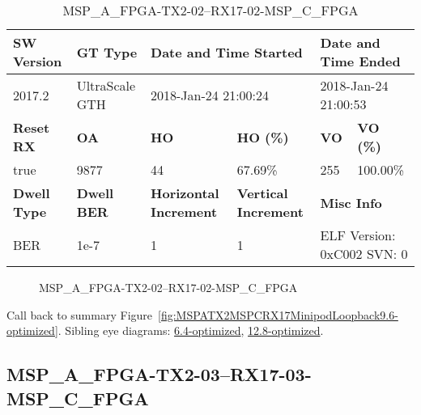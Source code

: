 \begin{table}[h]
\centering
\caption{MSP\_A\_FPGA-TX2-02--RX17-02-MSP\_C\_FPGA}
\label{tab:MSPAFPGATX202RX1702MSPCFPGA9.6-optimized}
\begin{tabular}{@{}|l|l|l|l|l|l|@{}}
\toprule
\textbf{SW Version}                & \textbf{GT Type}   & \multicolumn{2}{l|}{\textbf{Date and Time Started}}            & \multicolumn{2}{l|}{\textbf{Date and Time Ended}}        \\ \midrule
2017.2                       & UltraScale GTH          & \multicolumn{2}{l|}{2018-Jan-24 21:00:24}                   & \multicolumn{2}{l|}{2018-Jan-24 21:00:53}               \\ \midrule
\textbf{Reset RX}                  & \textbf{OA} & \textbf{HO}   & \textbf{HO (\%)} & \textbf{VO} & \textbf{VO (\%)} \\ \midrule
true & 9877        & 44          & 67.69\%        & 255        & 100.00\%       \\ \midrule
\textbf{Dwell Type}                & \textbf{Dwell BER} & \textbf{Horizontal Increment} & \textbf{Vertical Increment}    & \multicolumn{2}{l|}{\textbf{Misc Info}}                  \\ \midrule
BER                            & 1e-7        & 1        & 1           & \multicolumn{2}{l|}{ELF Version: 0xC002 SVN: 0}                         \\ \bottomrule
\end{tabular}
\end{table}

\begin{figure}[h]
\caption{MSP\_A\_FPGA-TX2-02--RX17-02-MSP\_C\_FPGA} \label{fig:MSPAFPGATX202RX1702MSPCFPGA9.6-optimized}
\end{figure}

Call back to summary Figure~\ref{fig:MSPATX2MSPCRX17MinipodLoopback9.6-optimized}.
Sibling eye diagrams: \hyperref[sec:MSPAFPGATX202RX1702MSPCFPGA6.4-optimized]{6.4-optimized}, \hyperref[sec:MSPAFPGATX202RX1702MSPCFPGA12.8-optimized]{12.8-optimized}.

\clearpage
\newpage


\subsection{MSP\_A\_FPGA-TX2-03--RX17-03-MSP\_C\_FPGA}\label{sec:MSPAFPGATX203RX1703MSPCFPGA9.6-optimized}

